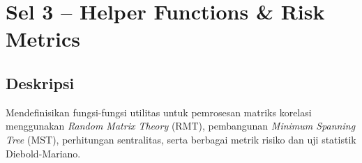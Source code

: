 \documentclass[12pt,a4paper]{article}
\begin{document}
\section{Sel 3 -- Helper Functions \& Risk Metrics}

\subsection{Deskripsi}
Mendefinisikan fungsi-fungsi utilitas untuk pemrosesan matriks korelasi menggunakan \textit{Random Matrix Theory} (RMT), pembangunan \textit{Minimum Spanning Tree} (MST), perhitungan sentralitas, serta berbagai metrik risiko dan uji statistik Diebold-Mariano.
\end{document}
